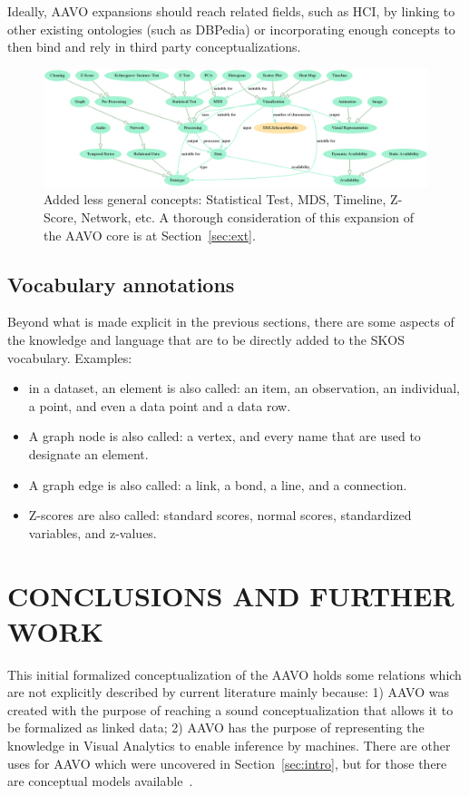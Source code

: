 \documentclass[12pt,fleqn]{article}
\begin{document}
Ideally, AAVO expansions should reach related fields, such as HCI,
by linking to other existing ontologies (such as DBPedia) or incorporating
enough concepts to then bind and rely in third party conceptualizations.

\begin{figure}[!htbp] %
\vspace{-2pt}
\begin{center}
\includegraphics[width=\textwidth]{../figs/aavo0.01_exemplified.png}
    \caption{Added less general concepts: Statistical Test, MDS, Timeline, Z-Score, Network, etc.
	A thorough consideration of this expansion of the AAVO core is at Section~\ref{sec:ext}.}
\label{fig:exemp}%
\end{center}
\end{figure}

\subsection{Vocabulary annotations}\label{sec:voc}
Beyond what is made explicit in the previous sections,
there are some aspects of the knowledge and language that
are to be directly added to the SKOS vocabulary.
Examples:
\begin{itemize}
	\item in a dataset, an element is also called: an item, an observation, an individual, a point,
		and even a data point and a data row. 
	\item A graph node is also called: a vertex, and every name that are used to designate an element.
	\item A graph edge is also called: a link, a bond, a line, and a connection.
	\item Z-scores are also called: standard scores, normal scores, standardized variables, and z-values. 
\end{itemize}

\section{CONCLUSIONS AND FURTHER WORK}\label{sec:con}
This initial formalized conceptualization of the AAVO
holds some relations which are not explicitly described by
current literature mainly because:
1) AAVO was created with the purpose of reaching a sound
conceptualization that allows it to be formalized as linked data;
2) AAVO has the purpose of representing the knowledge in Visual Analytics
to enable inference by machines.
There are other uses for AAVO which were uncovered in Section~\ref{sec:intro},
but for those there are conceptual models available~\cite{munzner}.
\end{document}

